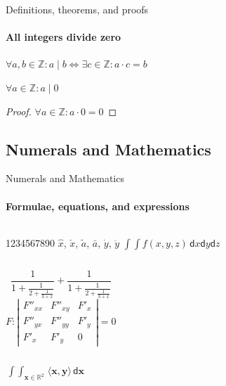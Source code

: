\documentclass{beamer}
\begin{document}
\begin{darkframes}
    \begin{frame}[label=proof]{Definitions, theorems, and proofs}
      \framesubtitle{All integers divide zero}
      \begin{definition}
        $\forall a,b\in\mathds{Z}: a\mid b\iff\exists c\in\mathds{Z}:a\cdot c=b$
      \end{definition}
      \begin{theorem}
        $\forall a\in\mathds{Z}: a\mid 0$
      \end{theorem}
      \begin{proof}[Proof\nopunct]
        $\forall a\in\mathds{Z}: a\cdot 0=0$
      \end{proof}
    \end{frame}

    \subsection{Numerals and Mathematics}
    \begin{frame}[label=math]{Numerals and Mathematics}
      \framesubtitle{Formulae, equations, and expressions}
      \begin{columns}[onlytextwidth]
          1234567890
          $\hat{x}$, $\check{x}$, $\tilde{a}$,
          $\bar{a}$, $\dot{y}$, $\ddot{y}$
          $\int \!\! \int f(x,y,z)\,\mathsf{d}x\mathsf{d}y\mathsf{d}z$
      \end{columns}
      \begin{columns}[onlytextwidth]
          $$\frac{1}{\displaystyle 1+
            \frac{1}{\displaystyle 2+
            \frac{1}{\displaystyle 3+x}}} +
            \frac{1}{1+\frac{1}{2+\frac{1}{3+x}}}$$
          $$F:\left| \begin{array}{ccc}
          F''_{xx} & F''_{xy} &  F'_x \\
          F''_{yx} & F''_{yy} &  F'_y \\
          F'_x     & F'_y     & 0
          \end{array}\right| = 0$$
      \end{columns}
      \begin{columns}[onlytextwidth]
          $$\mathop{\int \!\!\! \int}_{\mathbf{x} \in \mathds{R}^2}
          \! \langle \mathbf{x},\mathbf{y}\rangle\,\mathsf{d}\mathbf{x}$$

\end{columns}
\end{frame}
\end{darkframes}
\end{document}
